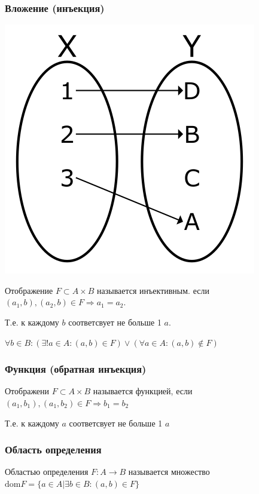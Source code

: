 \documentclass[letterpaper]{article}
\begin{document}
\subsubsection{Вложение (инъекция)}
\label{sec:orgef00f20}
\begin{center}
\includegraphics[width=.9\linewidth]{./src/Injection.png}
\end{center}
Отображение \(F \subset A \times B\) называется инъективным.
если \((a_1, b), (a_2, b) \in F \Rightarrow a_1 = a_2\).

Т.е. к каждому \(b\) соответсвует не больше 1 \(a\).

\(\forall b \in B: (\exists! a \in A: (a, b) \in F) \lor (\forall a \in A: (a, b) \notin F)\)
\subsubsection{Функция (обратная инъекция)}
\label{sec:org28f193e}
Отображени \(F \subset A \times B\) называется функцией, если
\((a_1, b_1), (a_1, b_2) \in F \Rightarrow b_1 = b_2\)

Т.е. к каждому \(a\) соответсвует не больше 1 \(a\)
\subsubsection{Область определения}
\label{sec:org3f0122b}
Областью определения \(F: A \rightarrow B\)
называется множество \(\text{dom} F = \{a \in A | \exists b \in B: (a, b) \in F\}\)
\end{document}
